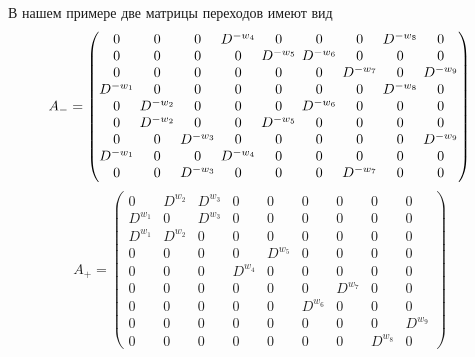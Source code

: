 \documentclass[specification,annotation,times]{itmo-student-thesis}
\begin{document}
В нашем примере две матрицы переходов  имеют вид
 \[
 \setlength{\arraycolsep}{2.pt}
A_{-}=
\begin{pmatrix}
  0           &0          & 0     &D^{-w_4}& 0              & 0&0 & D^{-w_8}&0 \\
   0          & 0        & 0     & 0    &D^{-w_5}&D^{-w_6}&   0 &    0 &  0  \\ 
    0         &  0       &  0    & 0    &   0  &   0  &D^{-w_7}&   0  &D^{-w_9}\\ 
D^{-w_1}&  0       &    0  &   0  &   0  &   0  & 0   &D^{-w_8}&  0  \\ 
  0          &D^{-w_2}&  0    & 0    &  0   &D^{-w_6}&  0  & 0    &0    \\ 
   0         &D^{-w_2}&   0   &  0   & D^{-w_5}&   0  &  0  &  0   & 0   \\ 
   0         &0         &D^{-w_3}& 0    &  0   &   0  &0    &0     &D^{-w_9} \\ 
D^{-w_1}&0         &   0   &D^{-w_4}&  0   & 0    & 0   &   0  &0    \\ 
   0        & 0        &D^{-w_3} &   0  &    0 &  0   &D^{-w_7}    & 0    &0     
               \end{pmatrix}
\]
\[
A_{+}=
\begin{pmatrix}
0              &D^{w_2}&D^{w_3}&  0  &      0         & 0&0 &0 &0 \\
D^{w_1}& 0              &D^{w_3}&0    &      0         &0 &0 &0 &0 \\
D^{w_1}&D^{w_2}&0               & 0   &       0        &0 &0 &0 &0 \\
0              & 0             &0                &0    &D^{w_5}&0 &0 & 0& 0 \\
 0             &  0            &0                & D^{w_4}& 0 &0 &0  &0 & 0 \\
  0            &   0           & 0               &  0& 0 & 0&D^{w_7}  &0 &0  \\
   0           &    0          &  0              & 0 & 0 &D^{w_6}&0  &0 &0  \\
    0          &      0        &   0             & 0 & 0 & 0& 0& 0&  D^{w_9} \\
     0         &     0         &    0            & 0 & 0&0 & 0&  D^{w_8} &0
\end{pmatrix}
\]
\end{document}
